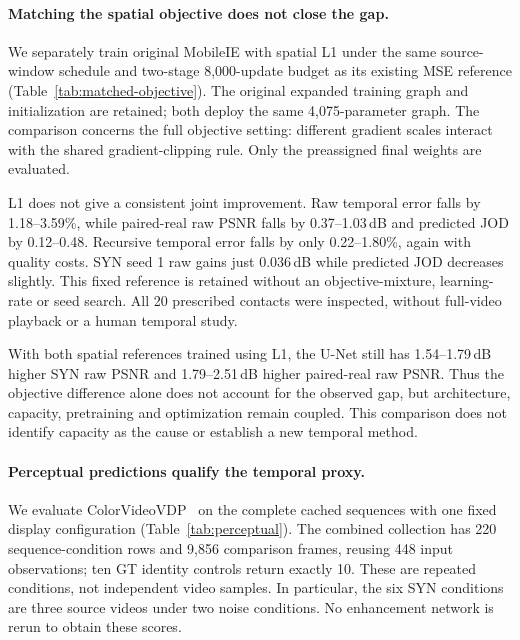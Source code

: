 \paragraph{Matching the spatial objective does not close the gap.}

We separately train original MobileIE with spatial L1 under the same
source-window schedule and two-stage 8,000-update budget as its existing
MSE reference (Table~\ref{tab:matched-objective}). The original expanded
training graph and initialization are retained; both deploy the same
4,075-parameter graph. The comparison concerns the full objective setting:
different gradient scales interact with the shared gradient-clipping rule.
Only the preassigned final weights are evaluated.

L1 does not give a consistent joint improvement. Raw temporal error falls
by 1.18--3.59\%, while paired-real raw PSNR falls by 0.37--1.03\,dB and
predicted JOD by 0.12--0.48. Recursive temporal error falls by only
0.22--1.80\%, again with quality costs. SYN seed 1 raw gains just
0.036\,dB while predicted JOD decreases slightly. This fixed reference
is retained without an objective-mixture, learning-rate or seed search.
All 20 prescribed contacts were inspected, without full-video playback
or a human temporal study.

With both spatial references trained using L1, the U-Net still has
1.54--1.79\,dB higher SYN raw PSNR and 1.79--2.51\,dB higher paired-real
raw PSNR. Thus the objective difference alone does not account for the
observed gap, but architecture, capacity, pretraining and optimization
remain coupled. This comparison does not identify capacity as the cause
or establish a new temporal method.

\paragraph{Perceptual predictions qualify the temporal proxy.}

We evaluate ColorVideoVDP~\cite{colorvideovdp} on the complete cached
sequences with one fixed display configuration
(Table~\ref{tab:perceptual}). The combined collection has 220
sequence-condition rows and 9,856 comparison frames, reusing 448 input
observations; ten GT identity controls return exactly 10. These are
repeated conditions, not independent video samples. In particular, the
six SYN conditions are three source videos under two noise conditions.
No enhancement network is rerun to obtain these scores.

